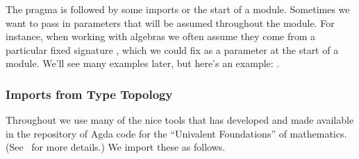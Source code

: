 The  pragma is followed by some imports or the start of a module. Sometimes we want to pass in parameters that will be assumed throughout the module. For instance, when working with algebras we often assume they come from a particular fixed signature , which we could fix as a parameter at the start of a module. We'll see many examples later, but here's an example:
\AgdaSpace{}\AgdaModule{\AgdaUnderscore{}}\AgdaSpace{}%
\AgdaSymbol{\{}\AgdaSpace{}%
\AgdaSymbol{:}\AgdaSpace{}%
\AgdaSpace{}%
\AgdaSpace{}%
\AgdaSymbol{\}}\AgdaSpace{}%
.





\subsubsection{Imports from Type Topology}\label{imports-from-type-topology}
Throughout we use many of the nice tools that \escardo has developed and made available in the \TypeTopology repository of Agda code for the ``Univalent Foundations'' of mathematics. (See~\cite{MHE} for more details.) We import these as follows.
\ccpad
